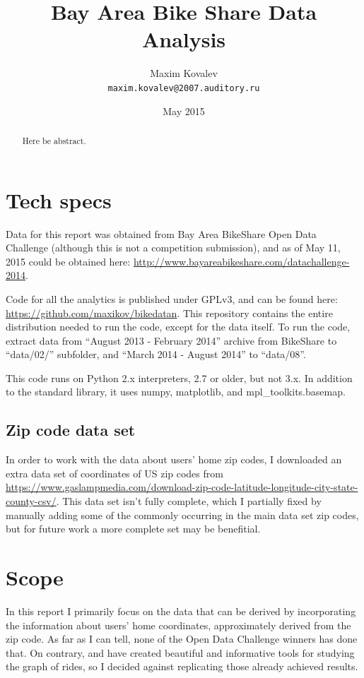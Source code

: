 \documentclass{article}
\title{Bay Area Bike Share Data Analysis}
\author{Maxim Kovalev\\\texttt{maxim.kovalev@2007.auditory.ru}}
\date{May 2015}
\begin{document}
\maketitle

\begin{abstract}
Here be abstract.
\end{abstract}

\section{Tech specs}
Data for this report was obtained from Bay Area BikeShare Open Data Challenge (although this is not a competition submission), and as of May 11, 2015 could be obtained here: \url{http://www.bayareabikeshare.com/datachallenge-2014}.

Code for all the analytics is published under GPLv3, and can be found here: \url{https://github.com/maxikov/bikedatan}. This repository contains the entire distribution needed to run the code, except for the data itself. To run the code, extract data from ``August 2013 - February 2014'' archive from BikeShare to ``data/02/'' subfolder, and ``March 2014 - August 2014'' to ``data/08''.

This code runs on Python 2.x interpreters, 2.7 or older, but not 3.x. In addition to the standard library, it uses numpy, matplotlib, and mpl\_toolkits.basemap.

\subsection{Zip code data set}

In order to work with the data about users' home zip codes, I downloaded an extra data set of coordinates of US zip codes from \url{https://www.gaslampmedia.com/download-zip-code-latitude-longitude-city-state-county-csv/}. This data set isn't fully complete, which I partially fixed by manually adding some of the commonly occurring in the main data set zip codes, but for future work a more complete set may be benefitial.

\section{Scope}

In this report I primarily focus on the data that can be derived by incorporating the information about users' home coordinates, approximately derived from the zip code. As far as I can tell, none of the Open Data Challenge winners has done that. On contrary, \cite{mousebird} and \cite{planetbabs} have created beautiful and informative tools for studying the graph of rides, so I decided against replicating those already achieved results.
\end{document}
